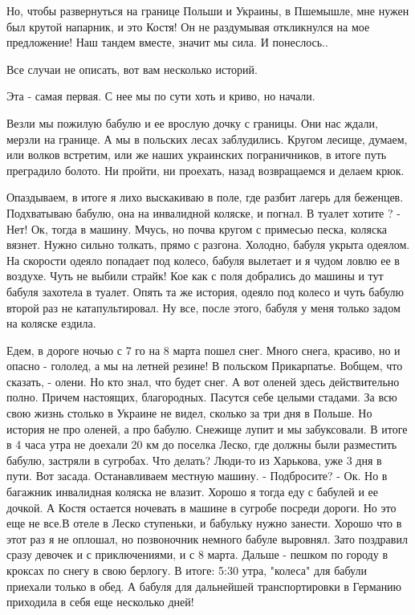 
Но, чтобы развернуться на границе Польши и Украины, в Пшемышле,  мне нужен был
крутой напарник, и это Костя! Он  не раздумывая откликнулся на мое предложение!
Наш тандем вместе, значит мы сила. И понеслось..

Все случаи не описать, вот вам несколько историй. 

Эта - самая  первая. С нее  мы по сути хоть и криво, но начали.

Везли мы пожилую бабулю и ее врослую дочку с границы. Они нас ждали, мерзли на
границе. А мы в  польских лесах заблудились. Кругом лесище, думаем, или волков
встретим, или же наших украинских пограничников, в итоге путь преградило
болото. Ни пройти, ни проехать, назад возвращаемся и делаем крюк.


Опаздываем, в  итоге я лихо выскакиваю в поле, где разбит лагерь для беженцев.
Подхватываю бабулю, она на инвалидной коляске, и погнал. В туалет хотите ? -
Нет! Ок, тогда в машину. Мчусь, но почва кругом с примесью песка, коляска
вязнет. Нужно сильно толкать, прямо с разгона. Холодно,  бабуля  укрыта
одеялом. На скорости одеяло попадает под колесо, бабуля вылетает и я чудом
ловлю ее в воздухе. Чуть не выбили страйк! Кое как с поля добрались до машины
и тут  бабуля захотела в туалет. Опять та же история, одеяло под колесо и чуть
бабулю второй раз не катапультировал. Ну все, после этого, бабуля у меня
только задом на коляске ездила.

Едем, в  дороге ночью с 7 го на 8 марта пошел снег.  Много снега, красиво, но и
опасно - гололед, а мы на летней резине!  В  польском Прикарпатье. Вобщем, что
сказать, - олени. Но кто знал, что будет снег. А вот   оленей здесь
действительно полно. Причем настоящих, благородных. Пасутся себе целыми
стадами.  За всю свою жизнь столько в Украине не видел, сколько за три дня в
Польше. Но история не про оленей, а про бабулю. Снежище лупит и мы забуксовали.
В итоге в 4 часа утра не доехали 20 км до поселка Леско, где должны были
разместить бабулю, застряли в сугробах. Что делать? Люди-то из Харькова, уже 3
дня в пути. Вот засада. Останавливаем местную машину. - Подбросите? - Ок. Но в
багажник инвалидная коляска не влазит. Хорошо я тогда еду с бабулей  и ее
дочкой. А Костя остается  ночевать в машине в сугробе посреди дороги. Но это
еще не все.В отеле в Леско ступеньки, и бабульку нужно занести. Хорошо что в
этот раз я не оплошал, но позвоночник немного бабуле выровнял. Зато поздравил
сразу девочек и с приключениями, и с 8 марта.  Дальше - пешком по городу в
кроксах по снегу в свою берлогу.  В итоге: 5:30 утра, "колеса" для бабули
приехали только в обед. А бабуля для дальнейшей транспортировки  в Германию
приходила в себя еще несколько дней! 

